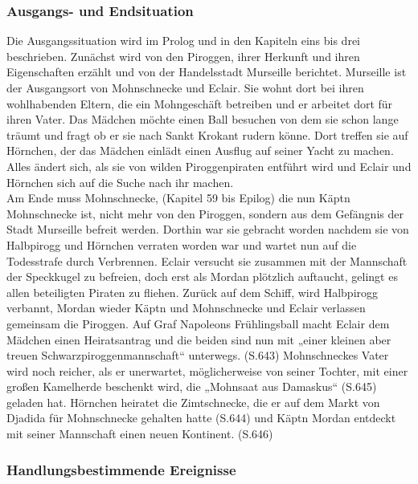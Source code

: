 \subsubsection{Ausgangs- und Endsituation}
Die Ausgangssituation wird im Prolog und in den Kapiteln eins bis drei beschrieben. Zunächst wird von den Piroggen, ihrer Herkunft und ihren Eigenschaften erzählt und von der Handelsstadt Murseille berichtet. Murseille ist der Ausgangsort von Mohnschnecke und Eclair. Sie wohnt dort bei ihren wohlhabenden Eltern, die ein Mohngeschäft betreiben und er arbeitet dort für ihren Vater. Das Mädchen möchte einen Ball besuchen von dem sie schon lange träumt und fragt ob er sie nach Sankt Krokant rudern könne. Dort treffen sie auf Hörnchen, der das Mädchen einlädt einen Ausflug auf seiner Yacht zu machen. Alles ändert sich, als sie von wilden Piroggenpiraten entführt wird und Eclair und Hörnchen sich auf die Suche nach ihr machen.
\\
Am Ende muss Mohnschnecke, (Kapitel 59 bis Epilog) die nun Käptn Mohnschnecke ist, nicht mehr von den Piroggen, sondern aus dem Gefängnis der Stadt Murseille befreit werden. Dorthin war sie gebracht worden nachdem sie von Halbpirogg und Hörnchen verraten worden war und wartet nun auf die Todesstrafe durch Verbrennen. Eclair versucht sie zusammen mit der Mannschaft der Speckkugel zu befreien, doch erst als Mordan plötzlich auftaucht, gelingt es allen beteiligten Piraten zu fliehen. Zurück auf dem Schiff, wird Halbpirogg verbannt, Mordan wieder Käptn und Mohnschnecke und Eclair verlassen gemeinsam die Piroggen. Auf Graf Napoleons Frühlingsball macht Eclair dem Mädchen einen Heiratsantrag und die beiden sind nun mit „einer kleinen aber treuen Schwarzpiroggenmannschaft“ unterwegs. (S.643) Mohnschneckes Vater wird noch reicher, als er unerwartet, möglicherweise von seiner Tochter, mit einer großen Kamelherde beschenkt wird, die „Mohnsaat aus Damaskus“ (S.645) geladen hat.
Hörnchen heiratet die Zimtschnecke, die er auf dem Markt von Djadida für Mohnschnecke gehalten hatte (S.644) und Käptn Mordan entdeckt mit seiner Mannschaft einen neuen Kontinent. (S.646)


\subsubsection{Handlungsbestimmende Ereignisse}


